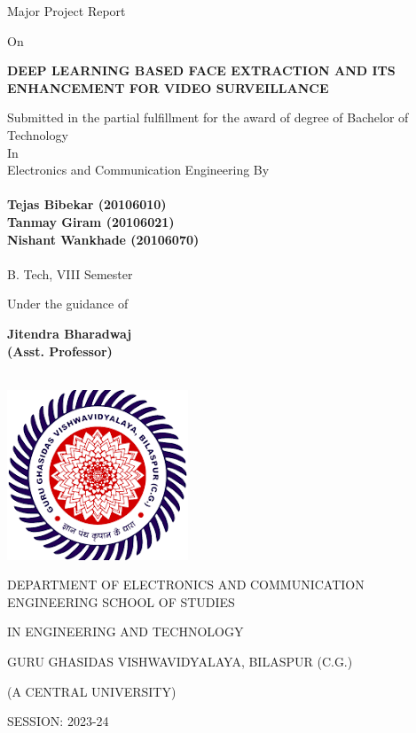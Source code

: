 \centering
Major Project Report

On

\textbf{DEEP LEARNING BASED FACE EXTRACTION AND ITS ENHANCEMENT FOR VIDEO SURVEILLANCE\\}

Submitted in the partial fulfillment for the award of degree of Bachelor of Technology\\
In\\
Electronics and Communication Engineering By\\
\textbf{\\}
\textbf{Tejas Bibekar (20106010)\\}
\textbf{Tanmay Giram (20106021)\\}
\textbf{Nishant Wankhade (20106070)\\}
\textbf{\\}
B. Tech, VIII Semester

Under the guidance of

\textbf{Jitendra Bharadwaj\\}
\textbf{(Asst. Professor)\\}
\textbf{\\}

\includegraphics[width=0.2\linewidth]{college logo.png}

DEPARTMENT OF ELECTRONICS AND COMMUNICATION ENGINEERING SCHOOL OF STUDIES

IN ENGINEERING AND TECHNOLOGY

GURU GHASIDAS VISHWAVIDYALAYA, BILASPUR (C.G.)

(A CENTRAL UNIVERSITY)

SESSION: 2023-24




 